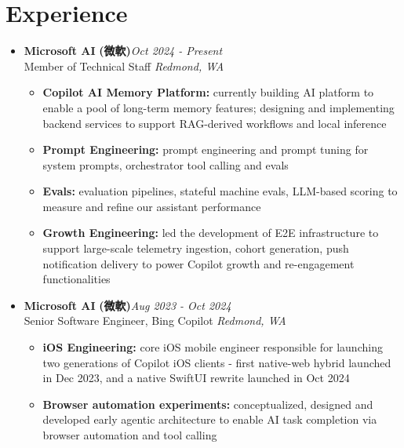 \section{\sectionheading Experience}

\begin{itemize}[leftmargin=0pt, label={}]%

\item{
{\sectionheading\large{\textbf{Microsoft AI}}} \textbf{(微軟)}\hfill {\sectionheading\small{\textit{Oct 2024 - Present}}}\\
{\sectionheading\small{Member of Technical Staff}}\hfill
{\sectionheading\small{\textit{Redmond, WA}}}

    \vspace{-6pt}
    \begin{itemize}[label=\textbullet, leftmargin=*, noitemsep]
        \item{\textbf{Copilot AI Memory Platform:} currently building AI platform to enable a pool of long-term memory features; designing and implementing backend services to support RAG-derived workflows and local inference}
        \item{\textbf{Prompt Engineering:} prompt engineering and prompt tuning for system prompts, orchestrator tool calling and evals}
        \item{\textbf{Evals:} evaluation pipelines, stateful machine evals, LLM-based scoring to measure and refine our assistant performance}
        \item{\textbf{Growth Engineering:} led the development of E2E infrastructure to support large-scale telemetry ingestion, cohort generation, push notification delivery to power Copilot growth and re-engagement functionalities}
    \end{itemize}
}

\item{
{\sectionheading\large{\textbf{Microsoft AI}}} \textbf{(微軟)}\hfill {\sectionheading\small{\textit{Aug 2023 - Oct 2024}}}\\
{\sectionheading\small{Senior Software Engineer, Bing Copilot}}\hfill
{\sectionheading\small{\textit{Redmond, WA}}}

    \vspace{-6pt}
    \begin{itemize}[label=\textbullet, leftmargin=*, noitemsep]
        \item{\textbf{iOS Engineering:} core iOS mobile engineer responsible for launching two generations of Copilot iOS clients - first native-web hybrid launched in Dec 2023, and a native SwiftUI rewrite launched in Oct 2024}
        \item{\textbf{Browser automation experiments:} conceptualized, designed and developed early agentic architecture to enable AI task completion via browser automation and tool calling}
    \end{itemize}
}


\end{itemize}

